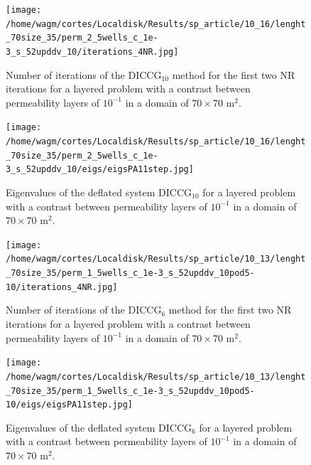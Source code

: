 \documentclass[12pt]{article}
\begin{document}
\begin{figure}[!h]
\centering
\begin{minipage}{.4\textwidth}
\vspace{-0.4cm}
\hspace{-1cm}
\texttt{[image: /home/wagm/cortes/Localdisk/Results/sp\_article/10\_16/lenght\_70size\_35/perm\_2\_5wells\_c\_1e-3\_s\_52upddv\_10/iterations\_4NR.jpg]}
\vspace{-1.3cm}
\caption{Number of iterations of the DICCG$_{10}$ method for the first two NR iterations for a layered problem with a contrast between permeability layers of $10^{-1}$ in a domain of $70 \times 70$ m$^2$.}
\label{fig:NR_D10_1}
\end{minipage}%
\hspace{15mm}
\begin{minipage}{.4\textwidth}
 \centering
\texttt{[image: /home/wagm/cortes/Localdisk/Results/sp\_article/10\_16/lenght\_70size\_35/perm\_2\_5wells\_c\_1e-3\_s\_52upddv\_10/eigs/eigsPA11step.jpg]}
\caption{Eigenvalues of the deflated system DICCG$_{10}$ for a layered problem with a contrast between permeability layers of $10^{-1}$ in a domain of $70 \times 70$ m$^2$.}
\label{fig:eigs_PA10_1}
\end{minipage}
\end{figure}



\begin{figure}[!h]
\centering
\begin{minipage}{.4\textwidth}
\vspace{-0.4cm}
\hspace{-1cm}
\texttt{[image: /home/wagm/cortes/Localdisk/Results/sp\_article/10\_13/lenght\_70size\_35/perm\_1\_5wells\_c\_1e-3\_s\_52upddv\_10pod5-10/iterations\_4NR.jpg]}
\vspace{-1.3cm}
\caption{Number of iterations of the DICCG$_6$ method for the first two NR iterations for a layered problem with a contrast between permeability layers of $10^{-1}$ in a domain of $70 \times 70$ m$^2$.}
\label{fig:NR_D6_1}
\end{minipage}%
\hspace{15mm}
\begin{minipage}{.4\textwidth}
 \centering
\texttt{[image: /home/wagm/cortes/Localdisk/Results/sp\_article/10\_13/lenght\_70size\_35/perm\_1\_5wells\_c\_1e-3\_s\_52upddv\_10pod5-10/eigs/eigsPA11step.jpg]}
\caption{Eigenvalues of the deflated system DICCG$_6$ for a layered problem with a contrast between permeability layers of $10^{-1}$ in a domain of $70 \times 70$ m$^2$.}
\label{fig:eigs_PA6_1}
\end{minipage}
\end{figure}
\end{document}
